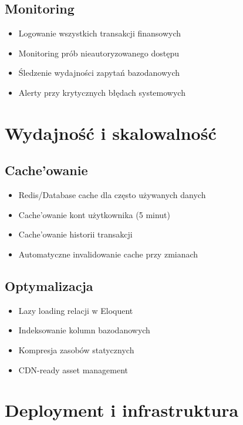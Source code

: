 \documentclass[12pt,a4paper]{article}
\begin{document}
    \subsection{Monitoring}
    \begin{itemize}
        \item Logowanie wszystkich transakcji finansowych
        \item Monitoring prób nieautoryzowanego dostępu
        \item Śledzenie wydajności zapytań bazodanowych
        \item Alerty przy krytycznych błędach systemowych
    \end{itemize}

    \section{Wydajność i skalowalność}

    \subsection{Cache'owanie}
    \begin{itemize}
        \item Redis/Database cache dla często używanych danych
        \item Cache'owanie kont użytkownika (5 minut)
        \item Cache'owanie historii transakcji
        \item Automatyczne invalidowanie cache przy zmianach
    \end{itemize}

    \subsection{Optymalizacja}
    \begin{itemize}
        \item Lazy loading relacji w Eloquent
        \item Indeksowanie kolumn bazodanowych
        \item Kompresja zasobów statycznych
        \item CDN-ready asset management
    \end{itemize}

    \section{Deployment i infrastruktura}
\end{document}
